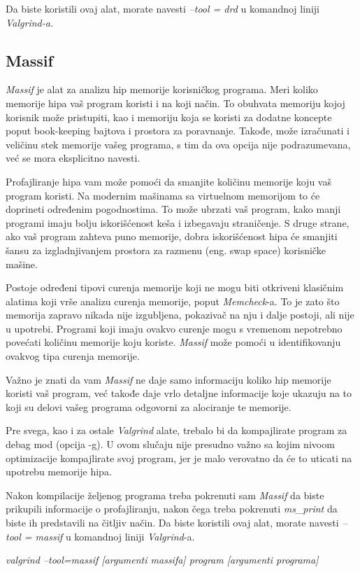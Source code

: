 \documentclass[12pt,oneside]{memoir}
\theoremstyle{plain}
\theoremstyle{definition}
\begin{document}
Da biste koristili ovaj alat, morate navesti \textit{--tool = drd} u komandnoj liniji \textit{Valgrind-a.}

\subsection{Massif}
\textit{Massif} je alat za analizu hip memorije korisničkog programa. Meri koliko memorije hipa vaš program koristi i na koji način. To obuhvata memoriju kojoj korisnik može pristupiti, kao i memoriju koja se koristi za dodatne koncepte poput book-keeping bajtova i prostora za poravnanje. Takođe, može izračunati i veličinu stek memorije vašeg programa, s tim da ova opcija nije podrazumevana, već se mora eksplicitno navesti.

Profajliranje hipa vam može pomoći da smanjite količinu memorije koju vaš program koristi. Na modernim mašinama sa virtuelnom memorijom to će doprineti određenim pogodnostima. To može ubrzati vaš program, kako manji programi imaju bolju iskorišćenost keša i izbegavaju straničenje. S druge strane, ako vaš program zahteva puno memorije, dobra iskorišćenost hipa će smanjiti šansu za izgladnjivanjem prostora za razmenu (eng. swap space) korisničke mašine. 

Postoje određeni tipovi curenja memorije koji ne mogu biti otkriveni klasičnim alatima koji vrše analizu curenja memorije, poput \textit{Memcheck}-a. To je zato što memorija zapravo nikada nije izgubljena, pokazivač na nju i dalje postoji, ali nije u upotrebi. Programi koji imaju ovakvo curenje mogu s vremenom nepotrebno povećati količinu memorije koju koriste. \textit{Massif} može pomoći u identifikovanju ovakvog tipa curenja memorije.

Važno je znati da vam \textit{Massif} ne daje samo informaciju koliko hip memorije koristi vaš program, već takođe daje vrlo detaljne informacije koje ukazuju na to koji su delovi vašeg programa odgovorni za alociranje te memorije.

Pre svega, kao i za ostale \textit{Valgrind} alate, trebalo bi da kompajlirate program za debag mod (opcija -g). U ovom slučaju nije presudno važno sa kojim nivoom optimizacije kompajlirate svoj program, jer je malo verovatno da će to uticati na upotrebu memorije hipa.

Nakon kompilacije željenog programa treba pokrenuti sam \textit{Massif} da biste prikupili informacije o profajliranju, nakon čega treba pokrenuti \textit{ms\_print} da biste ih predstavili na čitljiv način. Da biste koristili ovaj alat, morate navesti \textit{--tool = massif} u komandnoj liniji \textit{Valgrind}-a.
\begin{center}
\textit{valgrind --tool=massif [argumenti massifa] program [argumenti programa]}
\end{center}
 
\end{document}
